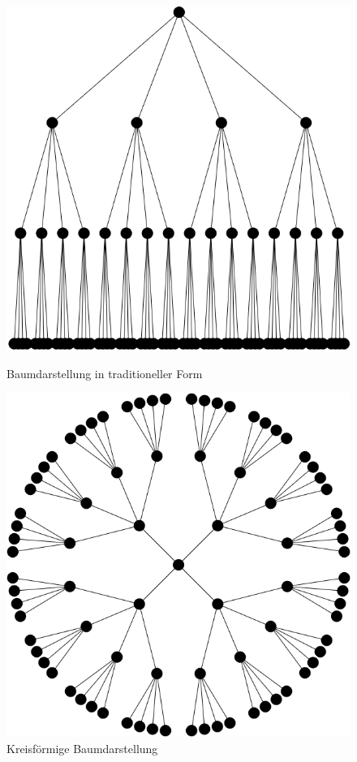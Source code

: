 \begin{figure}
	\centering
	\begin{minipage}{.5\textwidth}
		\centering
		\includegraphics[width=.9\linewidth]{../screenshots/lineargraphexample.PNG}
		\caption{Baumdarstellung in traditioneller Form}
		\label{fig:test1}
	\end{minipage}%
	\begin{minipage}{.5\textwidth}
		\centering
		\includegraphics[width=.9\linewidth]{../screenshots/radialgraphexample.PNG}
		\caption{Kreisförmige Baumdarstellung}
		\label{fig:test2}
	\end{minipage}
\end{figure}
